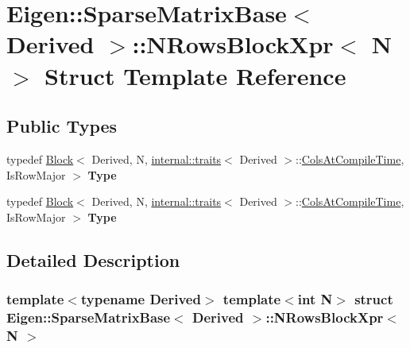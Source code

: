 \hypertarget{struct_eigen_1_1_sparse_matrix_base_1_1_n_rows_block_xpr}{}\section{Eigen\+:\+:Sparse\+Matrix\+Base$<$ Derived $>$\+:\+:N\+Rows\+Block\+Xpr$<$ N $>$ Struct Template Reference}
\label{struct_eigen_1_1_sparse_matrix_base_1_1_n_rows_block_xpr}
\subsection*{Public Types}
\begin{DoxyCompactItemize}
\item 
\mbox{\label{struct_eigen_1_1_sparse_matrix_base_1_1_n_rows_block_xpr_a194047179b454b4bc57182758a3eba39}} 
typedef \hyperlink{group___core___module_class_eigen_1_1_block}{Block}$<$ Derived, N, \hyperlink{struct_eigen_1_1internal_1_1traits}{internal\+::traits}$<$ Derived $>$\+::\hyperlink{group___sparse_core___module_a726a12d2ba40a5f476c247c8f6db39d9abde032f883577b8aaad1c2a29ac3f18c}{Cols\+At\+Compile\+Time}, Is\+Row\+Major $>$ {\bfseries Type}
\item 
\mbox{\label{struct_eigen_1_1_sparse_matrix_base_1_1_n_rows_block_xpr_a194047179b454b4bc57182758a3eba39}} 
typedef \hyperlink{group___core___module_class_eigen_1_1_block}{Block}$<$ Derived, N, \hyperlink{struct_eigen_1_1internal_1_1traits}{internal\+::traits}$<$ Derived $>$\+::\hyperlink{group___sparse_core___module_a726a12d2ba40a5f476c247c8f6db39d9abde032f883577b8aaad1c2a29ac3f18c}{Cols\+At\+Compile\+Time}, Is\+Row\+Major $>$ {\bfseries Type}
\end{DoxyCompactItemize}


\subsection{Detailed Description}
\subsubsection*{template$<$typename Derived$>$\newline
template$<$int N$>$\newline
struct Eigen\+::\+Sparse\+Matrix\+Base$<$ Derived $>$\+::\+N\+Rows\+Block\+Xpr$<$ N $>$}



